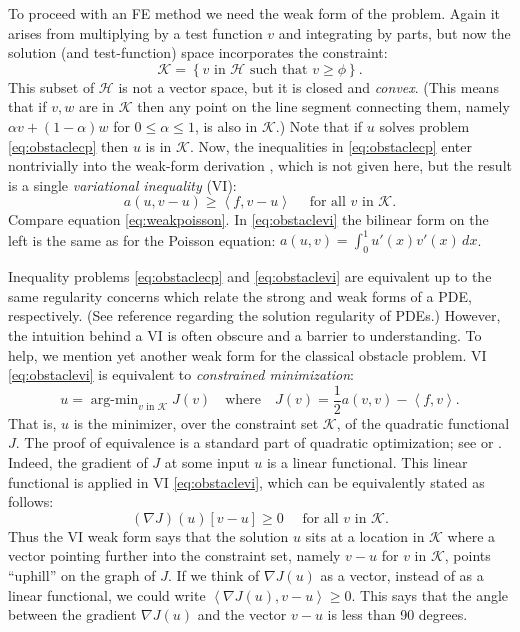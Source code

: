 \documentclass[letterpaper,final,12pt,reqno]{amsart}
\newcommand{\ip}[2]{\left<#1,#2\right>}
\begin{document}
To proceed with an FE method we need the weak form of the problem.  Again it arises from multiplying by a test function $v$ and integrating by parts, but now the solution (and test-function) space incorporates the constraint:
\begin{equation}
\mathcal{K} = \left\{v \text{ in } \mathcal{H} \text{ such that } v \ge \phi\right\}.  \label{eq:Kdefine}
\end{equation}
This subset of $\mathcal{H}$ is not a vector space, but it is closed and \emph{convex}.  (This means that if $v,w$ are in $\mathcal{K}$ then any point on the line segment connecting them, namely $\alpha v + (1-\alpha) w$ for $0 \le \alpha \le 1$, is also in $\mathcal{K}$.)  Note that if $u$ solves problem \eqref{eq:obstaclecp} then $u$ is in $\mathcal{K}$.  Now, the inequalities in \eqref{eq:obstaclecp} enter nontrivially into the weak-form derivation \cite[for example]{Bueler2020}, which is not given here, but the result is a single \emph{variational inequality} (VI):
\begin{equation}
  a(u,v-u) \ge \ip{f}{v-u} \quad \text{ for all } v \text{ in } \mathcal{K}. \label{eq:obstaclevi}
\end{equation}
Compare equation \eqref{eq:weakpoisson}.  In \eqref{eq:obstaclevi} the bilinear form on the left is the same as for the Poisson equation: $a(u,v) = \int_0^1 u'(x) v'(x)\,dx$.

Inequality problems \eqref{eq:obstaclecp} and \eqref{eq:obstaclevi} are equivalent up to the same regularity concerns which relate the strong and weak forms of a PDE, respectively.  (See reference \cite{Evans2010} regarding the solution regularity of PDEs.)  However, the intuition behind a VI is often obscure and a barrier to understanding.  To help, we mention yet another weak form for the classical obstacle problem.  VI \eqref{eq:obstaclevi} is equivalent to \emph{constrained minimization}:
\newcommand{\argmin}{\mathop{\mathrm{arg\text{-}min}}}
\begin{equation}
  u = \argmin_{v \text{ in } \mathcal{K}} J(v) \quad \text{where} \quad J(v) = \frac{1}{2} a(v,v) - \ip{f}{v}. \label{eq:obstaclemin}
\end{equation}
That is, $u$ is the minimizer, over the constraint set $\mathcal{K}$, of the quadratic functional $J$.  The proof of equivalence is a standard part of quadratic optimization; see \cite{KinderlehrerStampacchia1980} or \cite[Chapter 12]{Bueler2021}.  Indeed, the gradient of $J$ at some input $u$ is a linear functional.  This linear functional is applied in VI \eqref{eq:obstaclevi}, which can be equivalently stated as follows:
\begin{equation}
  (\nabla J)(u)[v-u] \ge 0 \quad \text{ for all } v \text{ in } \mathcal{K}. \label{eq:obstaclevigradient}
\end{equation}
Thus the VI weak form says that the solution $u$ sits at a location in $\mathcal{K}$ where a vector pointing further into the constraint set, namely $v-u$ for $v$ in $\mathcal{K}$, points ``uphill'' on the graph of $J$.  If we think of $\nabla J(u)$ as a vector, instead of as a linear functional, we could write $\ip{\nabla J(u)}{v-u} \ge 0$.  This says that the angle between the gradient $\nabla J(u)$ and the vector $v-u$ is less than 90 degrees.
\end{document}
